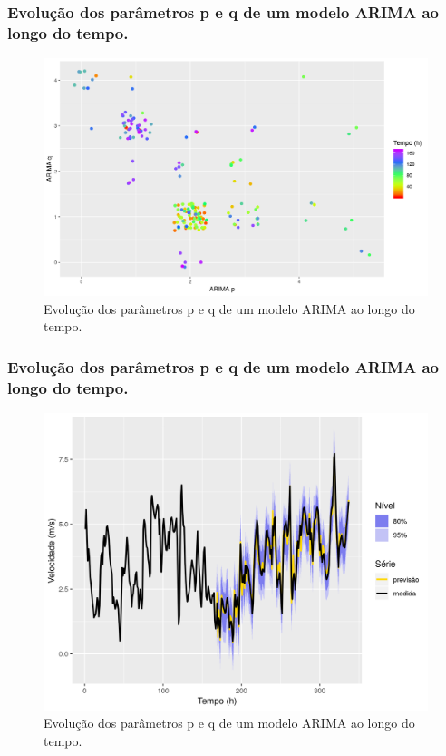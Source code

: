 \documentclass{beamer}
\begin{document}
\begin{frame}
	\frametitle{Evolução dos parâmetros p e q de um modelo ARIMA ao longo do tempo.}
	\begin{figure}
		\centering
		\includegraphics[width=\textwidth]{var_arima}
		\caption{Evolução dos parâmetros p e q de um modelo ARIMA ao longo do tempo.}
	\end{figure}
\end{frame}

\begin{frame}
	\frametitle{Evolução dos parâmetros p e q de um modelo ARIMA ao longo do tempo.}
	\begin{figure}
		\centering
		\includegraphics[width=\textwidth]{var_result}
		\caption{Evolução dos parâmetros p e q de um modelo ARIMA ao longo do tempo.}
	\end{figure}
\end{frame}
\end{document}
